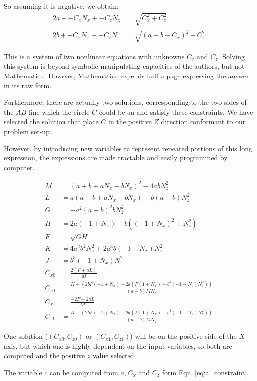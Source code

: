 \documentclass{article}
\begin{document}
So assuming it is negative, we obtain:
\begin{align}
  2a + -C_x N_x + -C_z N_z  &= \sqrt{C_x^2 + C_z ^2} \\
  2b + -C_x N_x + -C_z N_z  &= \sqrt{(a+b-C_x)^2 + C_z^2}
\end{align}

This is a system of two nonlinear equations with unknowns $C_x$ and $C_z$.
Solving this system is beyond symbolic manipulating capacities of the authors,
but not Mathematica.
However, Mathematica expends half a page expressing the answer
in its raw form.

Furthermore, there are actually two solutions, corresponding
to the two sides of the $AB$ line which the circle $C$ could be
on and satisfy these constraints.
We have selected the solution that place $C$ in the positive $Z$
direction conformant to our problem set-up.

However, by introducing new variables to represent repeated
portions of this long expression, the expressions are
made tractable and easily programmed by computer.

\begin{align}
M &= (a + b + a N_x - b N_x)^2 - 4 a b N_z^2 \\
L &= a (a + b + a N_x - b N_x) - b (a + b) N_z^2 \\
G &= -a^2 (a - b)^2 b N_z^2 \\
H &= 2 a (-1 + N_x) - b ((-1 + N_x)^2 + N_z^2) \\
F &= \sqrt{G H} \\
K &= 4 a^2 b^2 N_z^2 + 2 a^3 b (-3 + N_x) N_z^2 \\
J &= b^3 (-1 + N_x) N_z^2 \\
C_{x0} &= \frac{2 (F + a L)}{M} \\
C_{z0} &= \frac{K + (2 b F (-1 + N_x) -
  2 a (F (1 + N_x) + b^3 (-1 + N_x) N_z^2))}
{(a -  b) M N_z} \\
C_{x1} &= \frac{-2 F + 2 a L}{M} \\
  C_{z1} &= \frac{K - (2 b F (-1 + N_x) -
  2 a (F (1 + N_x) + b^3 (-1 + N_x) N_z^2))}
  {(a - b) M N_z}
\end{align}

One solution ($(C_{x0},C_{z0})$ or $(C_{x1},C_{z1})$) will be on the
positive side of the $X$ axis, but which one is highly dependent
on the input variables, so both are computed and the positive $z$
value selected.

The variable $c$ can be computed from $a$, $C_x$ and $C_z$
form Eqn. \ref{eq:a_constraint}.
\end{document}
